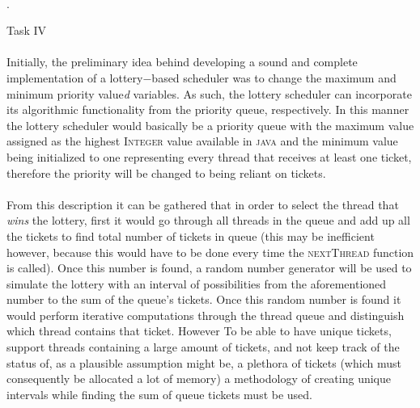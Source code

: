 \documentclass[12pt]{article}
\begin{document}
{\paragraph{}.
\begin{center}Task IV\end{center}
\paragraph{}Initially, the preliminary idea behind developing a sound and complete implementation of a lottery$-$based scheduler was to change
  the maximum and minimum priority value\textit{d} variables. As such, the lottery scheduler can incorporate its algorithmic
  functionality from the priority queue, respectively. In this manner the lottery scheduler would basically be a priority queue with the 
  maximum value assigned as the highest \textsc{Integer} value available in \textsc{java} and the minimum value being initialized to one 
  representing every thread that receives at least one ticket, therefore the priority will be changed to being reliant on tickets. \\
\paragraph{}From this description it can be gathered that in order to select the thread that \textit{wins} the lottery, first it would go through all
  threads in the queue and add up all the tickets to find total number of tickets in queue (this may be inefficient however, because this 
  would have to be done every time the \textsc{nextThread} function is called). Once this number is found, a random number generator will 
  be used to simulate the lottery with an interval of possibilities from the aforementioned number to the sum of the queue’s tickets. Once 
  this random number is found it would perform iterative computations through the thread queue and distinguish which thread contains that 
  ticket. However To be able to have unique tickets, support threads containing a large amount of tickets, and not keep track of the status 
  of, as a plausible assumption might be, a plethora of tickets (which must consequently be allocated a lot of memory) a methodology of 
  creating unique intervals while finding the sum of queue tickets must be used.\\
}
\end{document}
